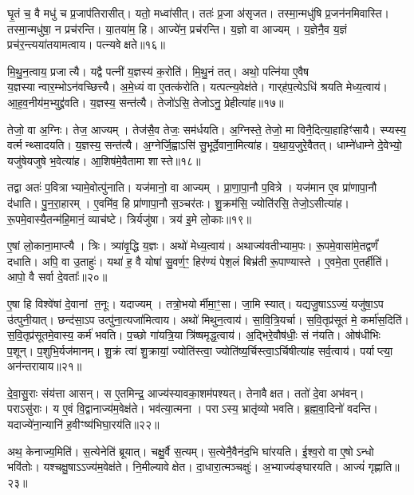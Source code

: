घृ॒तं च॒ वै मधु॑ च प्र॒जाप॑तिरासीत्।
यतो॒ मध्वा॑सीत्।
ततः॑ प्र॒जा अ॑सृजत।
तस्मा॒न्मधु॑षि प्र॒जन॑नमिवास्ति।
तस्मा॒न्मधु॑षा॒ न प्रच॑रन्ति।
या॒तया॑म॒ हि।
आज्ये॑न॒ प्रच॑रन्ति।
य॒ज्ञो वा आज्यम्।
य॒ज्ञेनै॒व य॒ज्ञं प्रच॑र॒न्त्यया॑तयामत्वाय।
पत्न्यवेक्षते॥१६॥

मि॒थु॒न॒त्वाय॒ प्रजात्यै।
यद्वै पत्नी॑ य॒ज्ञस्य॑ क॒रोति॑।
मि॒थु॒नं तत्।
अथो॒ पत्नि॑या ए॒वैष य॒ज्ञस्यान्वार॒म्भो\-ऽन॑वच्छित्त्यै।
अ॒मे॒ध्यं वा ए॒तत्क॑रोति।
यत्पत्न्य॒वेक्ष॑ते।
गार्‌\mbox{}ह॑प॒त्येऽधि॑ श्रयति मेध्य॒त्वाय॑।
आ॒ह॒व॒नीय॑म॒भ्युद्द्र॑वति।
य॒ज्ञस्य॒ सन्त॑त्यै।
तेजो॑ऽसि॒ तेजोऽनु॒ प्रेहीत्या॑ह॥१७॥

तेजो॒ वा अ॒ग्निः।
तेज॒ आज्यम्।
तेज॑सै॒व तेजः॒ सम॑र्धयति।
अ॒ग्निस्ते॒ तेजो॒ मा विनै॒दित्या॒हाहिꣳ॑सायै।
स्प्यस्य॒ वर्त्मन्थ्सादयति।
य॒ज्ञस्य॒ सन्त॑त्यै।
अ॒ग्नेर्जि॒ह्वाऽसि॑ सु॒भूर्दे॒वाना॒मित्या॑ह।
य॒था॒य॒जुरे॒वैतत्।
धाम्ने॑धाम्ने दे॒वेभ्यो॒ यजु॑षेयजुषे भ॒वेत्या॑ह।
आ॒शिष॑मे॒वैतामा शास्ते॥१८॥

तद्वा अतः॑ प॒वित्राभ्यामे॒वोत्पु॑नाति।
यज॑मानो॒ वा आज्यम्।
प्रा॒णा॒पा॒नौ प॒वित्रे।
यज॑मान ए॒व प्रा॑णापा॒नौ द॑धाति।
पु॒न॒रा॒हारम्।
ए॒वमि॑व॒ हि प्रा॑णापा॒नौ स॒ञ्चर॑तः।
शु॒क्रम॑सि॒ ज्योति॑रसि॒ तेजो॒\-ऽसीत्या॑ह।
रू॒पमे॒वास्यै॒तन्म॑हि॒मानं॒ व्याच॑ष्टे।
त्रिर्यजु॑षा।
त्रय॑ इ॒मे लो॒काः॥१९॥

ए॒षां लो॒काना॒माप्त्यै।
त्रिः।
त्र्या॑वृ॒द्धि य॒ज्ञः।
अथो॑ मेध्य॒त्वाय॑।
अथाज्य॑वतीभ्याम॒पः।
रू॒पमे॒वासा॑मे॒तद्वर्णं॑ दधाति।
अपि॒ वा उ॒ताहुः॑।
यथा॑ ह॒ वै योषा॑ सु॒वर्ण॒ꣳ॒ हिर॑ण्यं पेश॒लं बिभ्र॑ती रू॒पाण्यास्ते।
ए॒वमे॒ता ए॒तर्\mbox{}हीति॑।
आपो॒ वै सर्वा दे॒वताः᳚॥२०॥

ए॒षा हि विश्वे॑षां दे॒वानां त॒नूः।
यदाज्यम्।
तत्रो॒भयोर्मीमा॒ꣳ॒सा।
जा॒मि स्यात्।
यद्यजु॒षा\-ऽऽज्यं॒ यजु॑षा॒ऽप उ॑त्पुनी॒यात्।
छन्द॑सा॒ऽप उत्पु॑ना॒त्यजा॑मित्वाय।
अथो॑ मिथुन॒त्वाय॑।
सा॒वि॒त्रि॒यर्चा।
स॒वि॒तृप्र॑सूतं मे॒ कर्मा॑स॒दिति॑।
स॒वि॒तृप्र॑सूतमे॒वास्य॒ कर्म॑ भवति।
प॒च्छो गा॑यत्रि॒या त्रि॑ष्षमृद्ध॒त्वाय॑।
अ॒द्भिरे॒वौष॑धीः॒ सं न॑यति।
ओष॑धीभिः प॒शून्।
प॒शुभि॒र्यज॑मानम्।
शु॒क्रं त्वा॑ शु॒क्रायां॒ ज्योति॑स्त्वा॒ ज्योति॑ष्य॒र्चिस्त्वा॒\-ऽर्चिषीत्या॑ह सर्व॒त्वाय॑।
पर्याप्त्या॒ अन॑न्तरायाय॥२१॥\anuvakamend[ई॒क्ष॒त॒ आ॒ह॒ शा॒स्ते॒ लो॒का दे॒वता॑ भवति॒ षट् च॑]

दे॒वा॒सु॒राः संय॑त्ता आसन्।
स ए॒तमिन्द्र॒ आज्य॑स्यावका॒शम॑पश्यत्।
तेनावैक्षत।
ततो॑ दे॒वा अभ॑वन्।
पराऽसु॑राः।
य ए॒वं वि॒द्वानाज्य॑म॒वेक्ष॑ते।
भव॑त्या॒त्मना।
पराऽस्य॒ भ्रातृ॑व्यो भवति।
ब्र॒ह्म॒वा॒दिनो॑ वदन्ति।
यदाज्ये॑ना॒न्यानि॑ ह॒वीꣳष्य॑भिघा॒रय॑ति॥२२॥

अथ॒ केनाज्य॒मिति॑।
स॒त्येनेति॑ ब्रूयात्।
चक्षु॒र्वै स॒त्यम्।
स॒त्येनै॒वैन॑द॒भि घा॑रयति।
ई॒श्व॒रो वा ए॒षो\-ऽन्धो भवि॑तोः।
यश्चक्षु॒षा\-ऽऽज्य॑म॒वेक्ष॑ते।
नि॒मील्यावेक्षेत।
दा॒धारा॒त्मञ्चक्षुः॑।
अ॒भ्याज्य॑ङ्घारयति।
आज्यं॑ गृह्णाति॥२३॥

